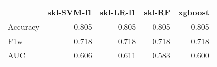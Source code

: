 \begin{tabular}{lrrrr}
\toprule
{} &  skl-SVM-l1 &  skl-LR-l1 &  skl-RF &  xgboost \\
\midrule
Accuracy &       0.805 &      0.805 &   0.805 &    0.805 \\
F1w      &       0.718 &      0.718 &   0.718 &    0.718 \\
AUC      &       0.606 &      0.611 &   0.583 &    0.600 \\
\bottomrule
\end{tabular}
